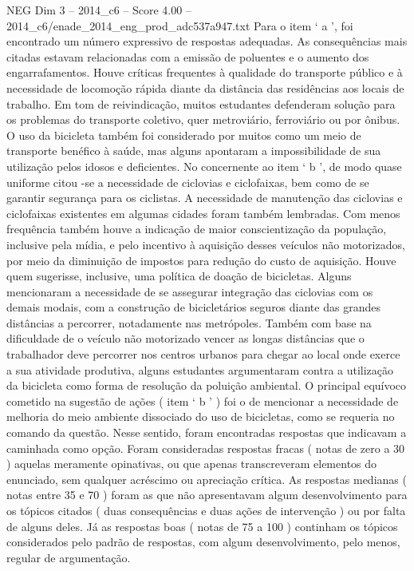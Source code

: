 \begin{textsample}{NEG Dim 3 – 2014\_c6 – Score 4.00 – 2014\_c6/enade\_2014\_eng\_prod\_adc537a947.txt}
Para o item ‘ a ’, foi encontrado um número expressivo de respostas adequadas.
As consequências mais citadas estavam relacionadas com a emissão de poluentes e o aumento dos engarrafamentos.
Houve críticas frequentes à qualidade do transporte público e à necessidade de locomoção rápida diante da distância das residências aos locais de trabalho.
Em tom de reivindicação, muitos estudantes defenderam solução para os problemas do transporte coletivo, quer metroviário, ferroviário ou por ônibus.
O uso da bicicleta também foi considerado por muitos como um meio de transporte benéfico à saúde, mas alguns apontaram a impossibilidade de sua utilização pelos idosos e deficientes.
No concernente ao item ‘ b ’, de modo quase uniforme citou -se a necessidade de ciclovias e ciclofaixas, bem como de se garantir segurança para os ciclistas.
A necessidade de manutenção das ciclovias e ciclofaixas existentes em algumas cidades foram também lembradas.
Com menos frequência também houve a indicação de maior conscientização da população, inclusive pela mídia, e pelo incentivo à aquisição desses veículos não motorizados, por meio da diminuição de impostos para redução do custo de aquisição.
Houve quem sugerisse, inclusive, uma política de doação de bicicletas.
Alguns mencionaram a necessidade de se assegurar integração das ciclovias com os demais modais, com a construção de bicicletários seguros diante das grandes distâncias a percorrer, notadamente nas metrópoles.
Também com base na dificuldade de o veículo não motorizado vencer as longas distâncias que o trabalhador deve percorrer nos centros urbanos para chegar ao local onde exerce a sua atividade produtiva, alguns estudantes argumentaram contra a utilização da bicicleta como forma de resolução da poluição ambiental.
O principal equívoco cometido na sugestão de ações ( item ‘ b ’ ) foi o de mencionar a necessidade de melhoria do meio ambiente dissociado do uso de bicicletas, como se requeria no comando da questão.
Nesse sentido, foram encontradas respostas que indicavam a caminhada como opção.
Foram consideradas respostas fracas ( notas de zero a 30 ) aquelas meramente opinativas, ou que apenas transcreveram elementos do enunciado, sem qualquer acréscimo ou apreciação crítica.
As respostas medianas ( notas entre 35 e 70 ) foram as que não apresentavam algum desenvolvimento para os tópicos citados ( duas consequências e duas ações de intervenção ) ou por falta de alguns deles.
Já as respostas boas ( notas de 75 a 100 ) continham os tópicos considerados pelo padrão de respostas, com algum desenvolvimento, pelo menos, regular de argumentação.

\end{textsample}
